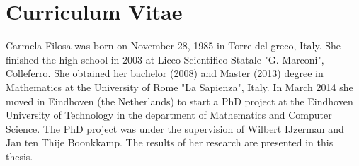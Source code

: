 \chapter*{Curriculum Vitae}
Carmela Filosa was born on November 28, 1985 in Torre del greco, Italy. She finished the high school in 2003 at Liceo Scientifico Statale "G. Marconi", Colleferro. She obtained her bachelor (2008) and Master (2013) degree in Mathematics at the University of Rome "La Sapienza", Italy. In March 2014 she moved in Eindhoven (the Netherlands) to start a PhD project at the Eindhoven University of Technology in the department of Mathematics and Computer Science. The PhD project was under the supervision of Wilbert IJzerman and Jan ten Thije Boonkkamp. The results of her research are presented in this thesis.  

